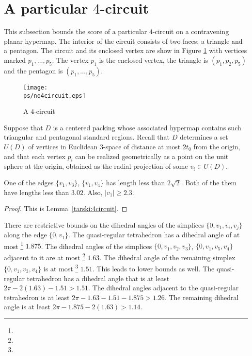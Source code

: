 \section{A particular $4$-circuit} %

This subsection bounds the score of a particular $4$-circuit on a
contravening planar hypermap.  The interior of the circuit
consists of two faces: a triangle and a pentagon.  The circuit and
its enclosed vertex are show in Figure \ref{fig:no4circuit} with
vertices marked $p_1,\ldots,p_5$.  The vertex $p_1$ is the
enclosed vertex, the triangle is $(p_1,p_2,p_5)$ and the pentagon
is $(p_1,\ldots,p_5)$.

\begin{figure}[htb]
  \centering
  \texttt{[image: \\ps/no4circuit.eps]}
  \caption{A $4$-circuit}
  \label{fig:no4circuit}
\end{figure}

Suppose that $D$ is a centered packing whose associated hypermap
contains such triangular and pentagonal standard regions. Recall
that $D$ determines a set $U(D)$ of vertices in Euclidean
$3$-space of distance at most $2t_0$ from the origin, and that
each vertex $p_i$ can be realized geometrically as a point on the
unit sphere at the origin, obtained as the radial projection of
some $v_i\in U(D)$.

\begin{lemma}  One of the edges $\{v_1,v_3\}$, $\{v_1,v_4\}$ has
length less than $2\sqrt{2}$.  Both of the them have lengths less
than $3.02$. Also, $|v_1|\ge2.3$.
\end{lemma}

\begin{proof} This is Lemma~\ref{tarski:4circuit}.
\end{proof}


There are restrictive bounds on the dihedral angles of the
simplices $\{0,v_1,v_i,v_j\}$ along the edge $\{0,v_1\}$. The
quasi-regular tetrahedron has a dihedral angle of at most%
\footnote{} $1.875$.  The dihedral angles of the
simplices $\{0,v_1,v_2,v_3\}$, $\{0,v_1,v_5,v_4\}$
adjacent to it are at most%
\footnote{}  $1.63$. The dihedral angle of the
remaining simplex $\{0,v_1,v_3,v_4\}$ is at most%
\footnote{} $1.51$.   This leads to lower bounds
as well. The quasi-regular tetrahedron has a dihedral angle that
is at least $2\pi - 2(1.63)-1.51 > 1.51$.  The dihedral angles
adjacent to the quasi-regular tetrahedron is at least $2\pi-
1.63-1.51-1.875> 1.26$. The remaining dihedral angle is at least
$2\pi-1.875-2(1.63) > 1.14$.

